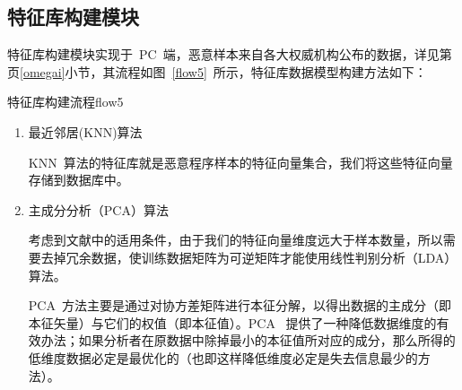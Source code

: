 	\subsection{特征库构建模块}
		 特征库构建模块实现于~PC~端，恶意样本来自各大权威机构公布的数据，详见第\pageref{omegai}页\ref{omegai}小节，其流程如图~\ref{flow5}~所示，特征库数据模型构建方法如下：

\begin{pics}[htbp]{特征库构建流程}{flow5}
\end{pics}

		\begin{enumerate}
		\item 最近邻居(KNN)算法\par
		 KNN~算法的特征库就是恶意程序样本的特征向量集合，我们将这些特征向量存储到数据库中。

		\item 主成分分析（PCA）算法\par
		 考虑到文献中的适用条件，由于我们的特征向量维度远大于样本数量，所以需要去掉冗余数据，使训练数据矩阵为可逆矩阵才能使用线性判别分析（LDA）算法。

		 PCA~方法主要是通过对协方差矩阵进行本征分解，以得出数据的主成分（即本征矢量）与它们的权值（即本征值）。PCA~ 提供了一种降低数据维度的有效办法；如果分析者在原数据中除掉最小的本征值所对应的成分，那么所得的低维度数据必定是最优化的（也即这样降低维度必定是失去信息最少的方法）。


\end{enumerate}
